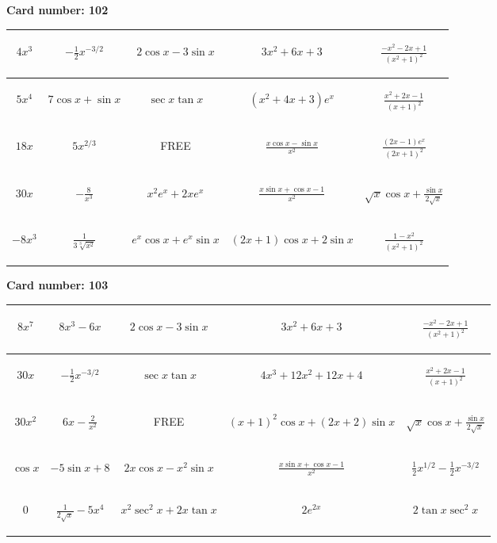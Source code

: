 \documentclass{article}
\newcommand{\entry}[1]{\begin{minipage}[t][2.75cm][t]{4cm} \vspace{1cm} \begin{center}#1\end{center} \end{minipage}}
\newcommand{\freespace}{\entry{FREE}}
\newcommand{\cardnumber}[1]{\noindent \textbf{Card number: #1} \bigskip}
\begin{document}
\pagebreak

\cardnumber{102}
\begin{center}
\begin{tabular}{|*{5}{c|}}
    \hline
    \entry{$4x^3$} & \entry{$-\frac{1}{2} x^{-3/2}$} & \entry{$2 \cos x - 3 \sin x$} & \entry{$3x^2 + 6x + 3$} & \entry{$\frac{-x^2 - 2x + 1}{(x^2 + 1)^2}$} \\ \hline
    \entry{$5x^4$} & \entry{$7 \cos x + \sin x$} & \entry{$\sec x \tan x$} & \entry{$(x^2 + 4x + 3) e^x$} & \entry{$\frac{x^2 + 2x - 1}{(x + 1)^2}$} \\ \hline
    \entry{$18x$} & \entry{$5x^{2/3}$} & \freespace & \entry{$\frac{x \cos x - \sin x}{x^2}$} & \entry{$\frac{(2x - 1) e^x}{(2x + 1)^2}$} \\ \hline
    \entry{$30x$} & \entry{$-\frac{8}{x^3}$} & \entry{$x^2 e^x + 2x e^x$} & \entry{$\frac{x \sin x + \cos x - 1}{x^2}$} & \entry{$\sqrt{x} \cos x + \frac{\sin x}{2 \sqrt{x}}$} \\ \hline
    \entry{$-8x^3$} & \entry{$\frac{1}{3\sqrt[3]{x^2}}$} & \entry{$e^x \cos x + e^x \sin x$} & \entry{$(2x + 1) \cos x + 2 \sin x$} & \entry{$\frac{1 - x^2}{(x^2 + 1)^2}$} \\ \hline
\end{tabular}
\end{center}

\pagebreak

\cardnumber{103}
\begin{center}
\begin{tabular}{|*{5}{c|}}
    \hline
    \entry{$8x^7$} & \entry{$8x^3 - 6x$} & \entry{$2 \cos x - 3 \sin x$} & \entry{$3x^2 + 6x + 3$} & \entry{$\frac{-x^2 - 2x + 1}{(x^2 + 1)^2}$} \\ \hline
    \entry{$30x$} & \entry{$-\frac{1}{2} x^{-3/2}$} & \entry{$\sec x \tan x$} & \entry{$4x^3 + 12x^2 + 12x + 4$} & \entry{$\frac{x^2 + 2x - 1}{(x + 1)^2}$} \\ \hline
    \entry{$30x^2$} & \entry{$6x - \frac{2}{x^2}$} & \freespace & \entry{$(x + 1)^2 \cos x + (2x + 2) \sin x$} & \entry{$\sqrt{x} \cos x + \frac{\sin x}{2 \sqrt{x}}$} \\ \hline
    \entry{$\cos x$} & \entry{$-5 \sin x + 8$} & \entry{$2x \cos x - x^2 \sin x$} & \entry{$\frac{x \sin x + \cos x - 1}{x^2}$} & \entry{$\frac{1}{2} x^{1/2} - \frac{1}{2} x^{-3/2}$} \\ \hline
    \entry{$0$} & \entry{$\frac{1}{2\sqrt{x}} - 5x^4$} & \entry{$x^2 \sec^2 x + 2x \tan x$} & \entry{$2e^{2x}$} & \entry{$2 \tan x \sec^2 x$} \\ \hline
\end{tabular}
\end{center}
\end{document}
